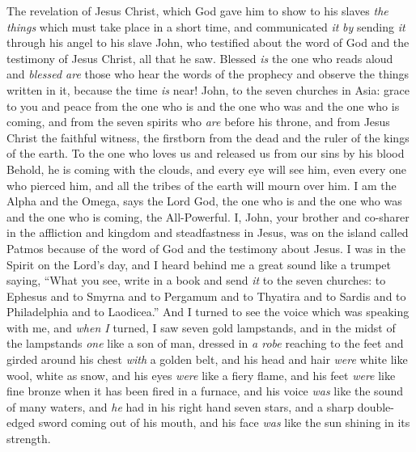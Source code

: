 
\begin{biblechapter} %
 The revelation of Jesus Christ, which God gave him to show to his slaves \textit{the things} which must take place in a short time, and communicated \textit{it} \textit{by} sending \textit{it} through his angel to his slave John,
\verse who testified about the word of God and the testimony of Jesus Christ, all that he saw.
\verse Blessed \textit{is} the one who reads aloud and \textit{blessed are} those who hear the words of the prophecy and observe the things written in it, because the time \textit{is} near!
 John, to the seven churches in Asia: grace to you and peace from the one who is and the one who was and the one who is coming, and from the seven spirits who \textit{are} before his throne,
\verse and from Jesus Christ the faithful witness, the firstborn from the dead and the ruler of the kings of the earth.
\verse To the one who loves us and released us from our sins by his blood
\verse Behold, he is coming with the clouds, 
and every eye will see him, 
even every one who pierced him, 
and all the tribes of the earth will mourn over him.
\verse I am the Alpha and the Omega, says the Lord God, the one who is and the one who was and the one who is coming, the All-Powerful.
 I, John, your brother and co-sharer in the affliction and kingdom and steadfastness in Jesus, was on the island called Patmos because of the word of God and the testimony about Jesus.
\verse I was in the Spirit on the Lord’s day, and I heard behind me a great sound like a trumpet
\verse saying, “What you see, write in a book and send \textit{it} to the seven churches: to Ephesus and to Smyrna and to Pergamum and to Thyatira and to Sardis and to Philadelphia and to Laodicea.”
\verse And I turned to see the voice which was speaking with me, and \textit{when I} turned, I saw seven gold lampstands,
\verse and in the midst of the lampstands \textit{one} like a son of man, dressed in \textit{a robe} reaching to the feet and girded around his chest \textit{with} a golden belt,
\verse and his head and hair \textit{were} white like wool, white as snow, and his eyes \textit{were} like a fiery flame,
\verse and his feet \textit{were} like fine bronze when it has been fired in a furnace, and his voice \textit{was} like the sound of many waters,
\verse and \textit{he} had in his right hand seven stars, and a sharp double-edged sword coming out of his mouth, and his face \textit{was} like the sun shining in its strength.

\end{biblechapter}
